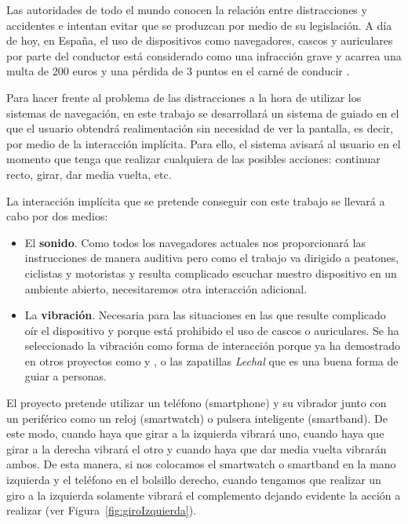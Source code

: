 Las autoridades de todo el mundo conocen la relación entre distracciones y accidentes e intentan
evitar que se produzcan por medio de su legislación. A día de hoy, en España, el uso de dispositivos
como navegadores, cascos y auriculares por parte del conductor está considerado como una infracción
grave y acarrea una multa de 200 euros y una pérdida de 3 puntos en el carné de conducir
\cite{Serrano14} .

Para hacer frente al problema de las distracciones a la hora de utilizar los sistemas de navegación,
en este trabajo se desarrollará un sistema de guiado en el que el usuario obtendrá realimentación
sin necesidad de ver la pantalla, es decir, por medio de la interacción implícita. Para ello, el
sistema avisará al usuario en el momento que tenga que realizar cualquiera de las posibles acciones:
continuar recto, girar, dar media vuelta, etc.

La  interacción implícita que  se pretende  conseguir con  este trabajo  se llevará  a cabo  por dos
medios:
\begin{itemize}
  \item El \textbf{sonido}. Como todos los navegadores actuales nos proporcionará las instrucciones
    de manera auditiva pero como el trabajo va dirigido a peatones, ciclistas y motoristas y resulta
    complicado escuchar nuestro dispositivo en un ambiente abierto, necesitaremos otra interacción
    adicional.
  \item La \textbf{vibración}. Necesaria para las situaciones en las que resulte complicado oír el
    dispositivo y porque está prohibido el uso de cascos o auriculares. Se ha seleccionado la
    vibración como forma de interacción porque ya ha demostrado en otros proyectos como
    \cite{Boemo12} y \cite{Merino13}, o las zapatillas \textit{Lechal} \cite{Lechal} que es una
    buena forma de guiar a personas.
\end{itemize}

El proyecto pretende utilizar un teléfono (smartphone) y su vibrador junto con un periférico como un
reloj (smartwatch) o pulsera inteligente (smartband). De este modo, cuando haya que girar a la
izquierda vibrará uno, cuando haya que girar a la derecha vibrará el otro y cuando haya que dar
media vuelta vibrarán ambos. De esta manera, si nos colocamos el smartwatch o smartband en la mano
izquierda y el teléfono en el bolsillo derecho, cuando tengamos que realizar un giro a la izquierda
solamente vibrará el complemento dejando evidente la acción a realizar (ver
Figura~\ref{fig:giroIzquierda}).

